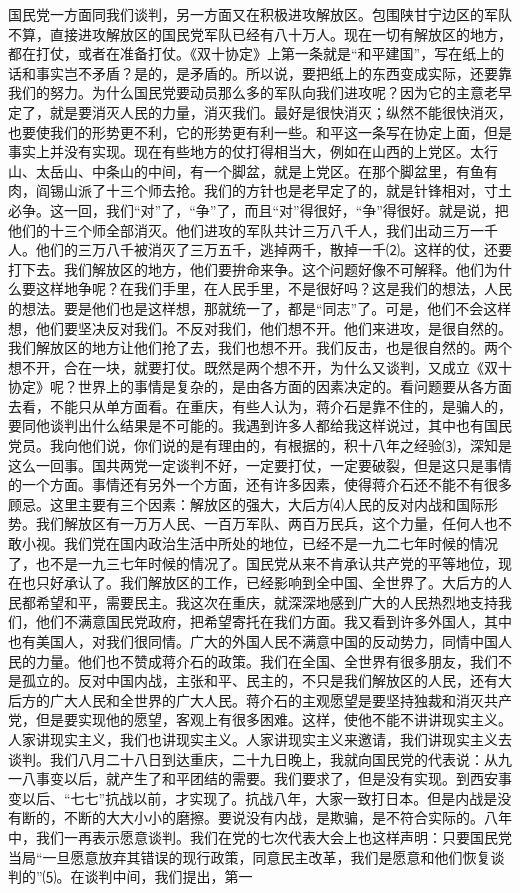 \documentclass[UTF-8, a5paper, 12pt]{ctexart}
\begin{document}
国民党一方面同我们谈判，另一方面又在积极进攻解放区。包围陕甘宁边区的军队不算，直接进攻解放区的国民党军队已经有八十万人。现在一切有解放区的地方，都在打仗，或者在准备打仗。《双十协定》上第一条就是“和平建国”，写在纸上的话和事实岂不矛盾？是的，是矛盾的。所以说，要把纸上的东西变成实际，还要靠我们的努力。为什么国民党要动员那么多的军队向我们进攻呢？因为它的主意老早定了，就是要消灭人民的力量，消灭我们。最好是很快消灭；纵然不能很快消灭，也要使我们的形势更不利，它的形势更有利一些。和平这一条写在协定上面，但是事实上并没有实现。现在有些地方的仗打得相当大，例如在山西的上党区。太行山、太岳山、中条山的中间，有一个脚盆，就是上党区。在那个脚盆里，有鱼有肉，阎锡山派了十三个师去抢。我们的方针也是老早定了的，就是针锋相对，寸土必争。这一回，我们“对”了，“争”了，而且“对”得很好，“争”得很好。就是说，把他们的十三个师全部消灭。他们进攻的军队共计三万八千人，我们出动三万一千人。他们的三万八千被消灭了三万五千，逃掉两千，散掉一千⑵。这样的仗，还要打下去。我们解放区的地方，他们要拚命来争。这个问题好像不可解释。他们为什么要这样地争呢？在我们手里，在人民手里，不是很好吗？这是我们的想法，人民的想法。要是他们也是这样想，那就统一了，都是“同志”了。可是，他们不会这样想，他们要坚决反对我们。不反对我们，他们想不开。他们来进攻，是很自然的。我们解放区的地方让他们抢了去，我们也想不开。我们反击，也是很自然的。两个想不开，合在一块，就要打仗。既然是两个想不开，为什么又谈判，又成立《双十协定》呢？世界上的事情是复杂的，是由各方面的因素决定的。看问题要从各方面去看，不能只从单方面看。在重庆，有些人认为，蒋介石是靠不住的，是骗人的，要同他谈判出什么结果是不可能的。我遇到许多人都给我这样说过，其中也有国民党员。我向他们说，你们说的是有理由的，有根据的，积十八年之经验⑶，深知是这么一回事。国共两党一定谈判不好，一定要打仗，一定要破裂，但是这只是事情的一个方面。事情还有另外一个方面，还有许多因素，使得蒋介石还不能不有很多顾忌。这里主要有三个因素：解放区的强大，大后方⑷人民的反对内战和国际形势。我们解放区有一万万人民、一百万军队、两百万民兵，这个力量，任何人也不敢小视。我们党在国内政治生活中所处的地位，已经不是一九二七年时候的情况了，也不是一九三七年时候的情况了。国民党从来不肯承认共产党的平等地位，现在也只好承认了。我们解放区的工作，已经影响到全中国、全世界了。大后方的人民都希望和平，需要民主。我这次在重庆，就深深地感到广大的人民热烈地支持我们，他们不满意国民党政府，把希望寄托在我们方面。我又看到许多外国人，其中也有美国人，对我们很同情。广大的外国人民不满意中国的反动势力，同情中国人民的力量。他们也不赞成蒋介石的政策。我们在全国、全世界有很多朋友，我们不是孤立的。反对中国内战，主张和平、民主的，不只是我们解放区的人民，还有大后方的广大人民和全世界的广大人民。蒋介石的主观愿望是要坚持独裁和消灭共产党，但是要实现他的愿望，客观上有很多困难。这样，使他不能不讲讲现实主义。人家讲现实主义，我们也讲现实主义。人家讲现实主义来邀请，我们讲现实主义去谈判。我们八月二十八日到达重庆，二十九日晚上，我就向国民党的代表说：从九一八事变以后，就产生了和平团结的需要。我们要求了，但是没有实现。到西安事变以后、“七七”抗战以前，才实现了。抗战八年，大家一致打日本。但是内战是没有断的，不断的大大小小的磨擦。要说没有内战，是欺骗，是不符合实际的。八年中，我们一再表示愿意谈判。我们在党的七次代表大会上也这样声明：只要国民党当局“一旦愿意放弃其错误的现行政策，同意民主改革，我们是愿意和他们恢复谈判的”⑸。在谈判中间，我们提出，第一
\end{document}

